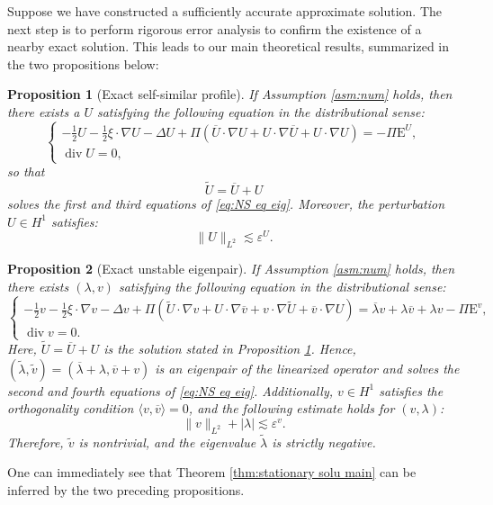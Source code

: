 \documentclass[11pt,a4paper]{article}
\numberwithin{equation}{section}
\newcommand{\Epsilon}{\mathrm{E}}
\newcommand{\cdummy}{\cdot}
\newcommand{\tmop}[1]{\ensuremath{\operatorname{#1}}}
\newtheorem{proposition}{Proposition}
{\theorembodyfont{\rmfamily}\newtheorem{remark}{Remark}}
\begin{document}
Suppose we have constructed a sufficiently accurate approximate solution. The next step is to perform rigorous error analysis to confirm the existence of a
nearby exact solution. This leads to our main theoretical results, summarized in the two propositions below:

\begin{proposition}[Exact self-similar profile]
  \label{prop:U}If Assumption \ref{asm:num} holds, then there exists a $U$
  satisfying the following equation in the distributional sense:
  \begin{equation}
    \left\{\begin{array}{l}
      - \frac{1}{2} U - \frac{1}{2} \xi \cdot \nabla U - \Delta U + \Pi
      (\overline{U} \cdot \nabla U + U \cdot \nabla \overline{U} + U \cdot
      \nabla U) = - \Pi \Epsilon^U,\\
      \tmop{div} U = 0,
    \end{array}\right. \label{eq:U pert}
  \end{equation}so that 
  \begin{equation}
  \label{Decomp-Utilde}
\widetilde{U} = \overline{U} + U
\end{equation}
solves the first and third equations of
  \eqref{eq:NS eq eig}.
  Moreover, the perturbation $U\in H^1$ satisfies:
  \[ \| U \|_{L^2} \lesssim \varepsilon^U . \]
  
  
\end{proposition}

\begin{proposition}[Exact unstable eigenpair]
  \label{prop:u lambda}If Assumption \ref{asm:num} holds, then there exists
  $(\lambda, v)$ satisfying the following equation in the distributional sense:
  \begin{equation}
    \left\{\begin{array}{l}
      - \frac{1}{2} v - \frac{1}{2} \xi \cdummy \nabla v - \Delta v + \Pi
      (\widetilde{U} \cdot \nabla v + U \cdot \nabla \overline{v} + v \cdot \nabla
      \widetilde{U} + \overline{v} \cdot \nabla U) = \overline{\lambda} v +
      \lambda \overline{v} + \lambda v - \Pi\Epsilon^v,\\
      \tmop{div} v = 0.
    \end{array}\right. \label{eq:u pert}
  \end{equation}
  Here, $\widetilde{U} = \overline{U} + U$ is the solution stated in Proposition \ref{prop:U}. Hence, $(\widetilde{\lambda}, \widetilde{v}) = (\overline{\lambda} + \lambda,
  \overline{v} + v)$ is an eigenpair of the linearized operator
  and solves the second and fourth equations of
  \eqref{eq:NS eq eig}.  
  Additionally,
  $v\in H^1$ satisfies the orthogonality condition $ \langle v, \overline{v} \rangle = 0$, and the following estimate holds for $(v, \lambda)$:
  \[ \| v \|_{L^2} + | \lambda | \lesssim \varepsilon^v . \]
  Therefore, $\widetilde{v}$ is nontrivial, and the eigenvalue $\widetilde{\lambda}$ is strictly
  negative.
\end{proposition}
One can immediately see that Theorem \ref{thm:stationary solu main} can be inferred by the two preceding propositions.
\end{document}
